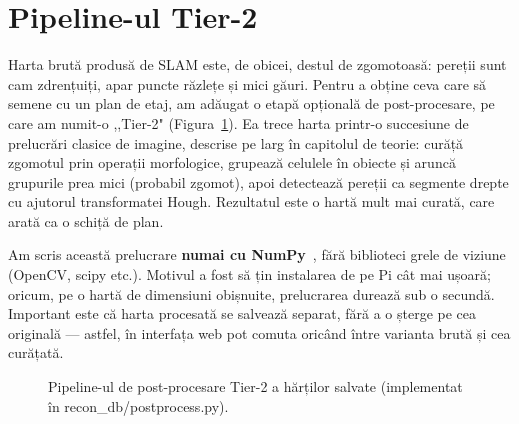 \documentclass[a4paper,12pt,twoside,openany]{report}
\renewcommand{\texttt}[1]{\textnormal{#1}}
\begin{document}
\section{Pipeline-ul Tier-2}
\label{sec:tier2}

Harta brută produsă de SLAM este, de obicei, destul de zgomotoasă: pereții
sunt cam zdrențuiți, apar puncte răzlețe și mici găuri. Pentru a obține ceva
care să semene cu un plan de etaj, am adăugat o etapă opțională de
post-procesare, pe care am numit-o ,,Tier-2" (Figura~\ref{fig:tier2}). Ea trece
harta printr-o succesiune de prelucrări clasice de imagine, descrise pe larg în
capitolul de teorie: curăță zgomotul prin operații morfologice, grupează
celulele în obiecte și aruncă grupurile prea mici (probabil zgomot), apoi
detectează pereții ca segmente drepte cu ajutorul transformatei Hough.
Rezultatul este o hartă mult mai curată, care arată ca o schiță de plan.

Am scris această prelucrare \textbf{numai cu NumPy}~\cite{harris2020numpy}, fără
biblioteci grele de viziune (OpenCV, scipy etc.). Motivul a fost să țin
instalarea de pe Pi cât mai ușoară; oricum, pe o hartă de dimensiuni obișnuite,
prelucrarea durează sub o secundă. Important este că harta procesată se salvează
separat, fără a o șterge pe cea originală — astfel, în interfața web pot comuta
oricând între varianta brută și cea curățată.

\begin{figure}[H]
\centering
{}
\caption{Pipeline-ul de post-procesare Tier-2 a hărților salvate (implementat în \texttt{recon\_db/\allowbreak postprocess.py}).}
\label{fig:tier2}
\end{figure}
\end{document}
